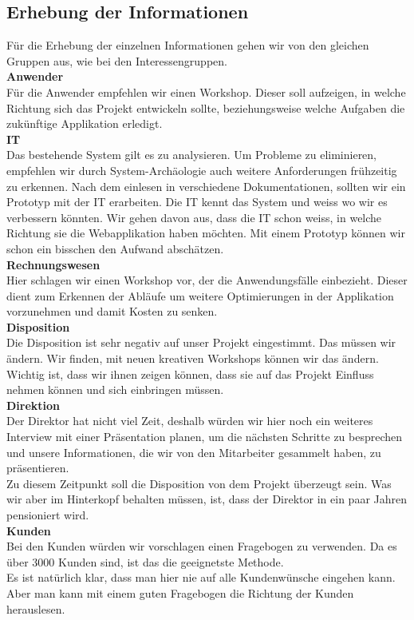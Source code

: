 \subsection{Erhebung der Informationen}
Für die Erhebung der einzelnen Informationen gehen wir von den gleichen Gruppen aus, wie bei den Interessengruppen.\\[2ex]
\textbf{Anwender}\\
Für die Anwender empfehlen wir einen Workshop. Dieser soll aufzeigen, in welche Richtung sich das Projekt entwickeln sollte, beziehungsweise welche Aufgaben die zukünftige Applikation erledigt.\\[2ex]
%
\textbf{IT}\\
Das bestehende System gilt es zu analysieren. Um Probleme zu eliminieren, empfehlen wir durch System-Archäologie auch weitere Anforderungen frühzeitig zu erkennen.
Nach dem einlesen in verschiedene Dokumentationen, sollten wir ein Prototyp mit der IT erarbeiten. Die IT kennt das System und weiss wo wir es verbessern könnten. Wir gehen davon aus, dass die IT schon weiss, in welche Richtung sie die Webapplikation haben möchten. Mit einem Prototyp können wir schon ein bisschen den Aufwand abschätzen.\\[2ex]
%
\textbf{Rechnungswesen}\\
Hier schlagen wir einen Workshop vor, der die Anwendungsfälle einbezieht. 
Dieser dient zum Erkennen der Abläufe um weitere Optimierungen in der Applikation vorzunehmen und damit Kosten zu senken.\\[2ex]
%
\textbf{Disposition}\\
Die Disposition ist sehr negativ auf unser Projekt eingestimmt. Das müssen wir ändern. Wir finden, mit neuen kreativen Workshops können wir das ändern. Wichtig ist, dass wir ihnen zeigen können, dass sie 
auf das Projekt Einfluss nehmen können und sich einbringen müssen.\\[2ex]
%
\textbf{Direktion}\\
Der Direktor hat nicht viel Zeit, deshalb würden wir hier noch ein weiteres Interview mit einer Präsentation planen, um die nächsten Schritte zu besprechen und unsere Informationen, die wir von den Mitarbeiter gesammelt haben, zu präsentieren.\\
Zu diesem Zeitpunkt soll die Disposition von dem Projekt überzeugt sein. Was wir aber im Hinterkopf behalten müssen, ist, dass der Direktor in ein paar Jahren pensioniert wird.\\[2ex]
%
\textbf{Kunden}\\
Bei den Kunden würden wir vorschlagen einen Fragebogen zu verwenden. Da es über 3000 Kunden sind, ist das die geeignetste Methode.\\
Es ist natürlich klar, dass man hier nie auf alle Kundenwünsche eingehen kann. Aber man kann mit einem guten Fragebogen die Richtung der Kunden herauslesen.